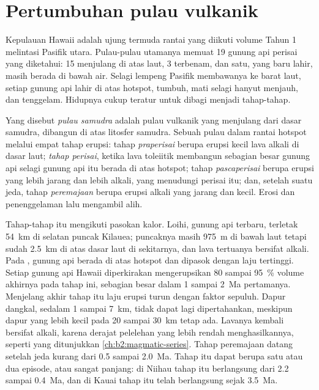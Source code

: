 \section{Pertumbuhan pulau vulkanik}\label{sec:b2:oceanic-islands:growth}

Kepulauan Hawaii adalah ujung termuda rantai yang diikuti volume Tahun 1 melintasi
Pasifik utara. Pulau-pulau utamanya memuat 19 gunung api perisai yang diketahui: 15 menjulang di atas laut,
3 terbenam, dan satu, yang baru lahir, masih berada di bawah air. Selagi lempeng Pasifik membawanya
ke barat laut, setiap gunung api lahir di atas hotspot, tumbuh, mati selagi hanyut menjauh, dan tenggelam. Hidupnya
cukup teratur untuk dibagi menjadi tahap-tahap.

\begin{definition}\label{def:b2:oceanic-islands:stages}
Yang disebut \emph{pulau samudra} adalah pulau vulkanik yang menjulang dari dasar
samudra, dibangun di atas litosfer samudra. Sebuah pulau dalam rantai hotspot melalui empat tahap
erupsi: tahap \emph{praperisai} berupa erupsi kecil lava alkali di dasar laut;
\emph{tahap perisai}, ketika lava toleiitik membangun sebagian besar gunung api
selagi gunung api itu berada di atas hotspot; tahap \emph{pascaperisai} berupa erupsi yang lebih jarang dan lebih alkali,
yang menudungi perisai itu; dan, setelah suatu jeda, tahap \emph{peremajaan} berupa erupsi alkali yang jarang dan
kecil. Erosi dan penenggelaman lalu mengambil alih.
\end{definition}

Tahap-tahap itu mengikuti pasokan kalor. Loihi, gunung api terbaru, terletak \qty{54}{km} di selatan
puncak Kilauea; puncaknya masih \qty{975}{m} di bawah laut tetapi sudah \qty{2.5}{km} di atas
dasar laut di sekitarnya, dan lava tertuanya bersifat alkali. Pada , gunung api berada di atas
hotspot dan dipasok dengan laju tertinggi. Setiap gunung api Hawaii diperkirakan mengerupsikan 80 sampai
\qty{95}{\percent} volume akhirnya pada tahap ini, sebagian besar dalam 1 sampai \qty{2}{Ma} pertamanya.
Menjelang akhir tahap itu laju erupsi turun dengan faktor sepuluh. Dapur  dangkal, sedalam 1
sampai \qty{7}{km}, tidak dapat lagi dipertahankan, meskipun dapur  yang lebih kecil pada 20 sampai \qty{30}{km}
tetap ada. Lavanya kembali bersifat alkali, karena derajat pelelehan yang lebih rendah menghasilkannya, seperti yang
ditunjukkan \cref{ch:b2:magmatic-series}. Tahap peremajaan datang setelah jeda kurang dari 0.5
sampai \qty{2.0}{Ma}. Tahap itu dapat berupa satu atau dua episode, atau sangat panjang: di Niihau tahap itu berlangsung dari 2.2 sampai
\qty{0.4}{Ma}, dan di Kauai tahap itu telah berlangsung sejak \qty{3.5}{Ma}.

